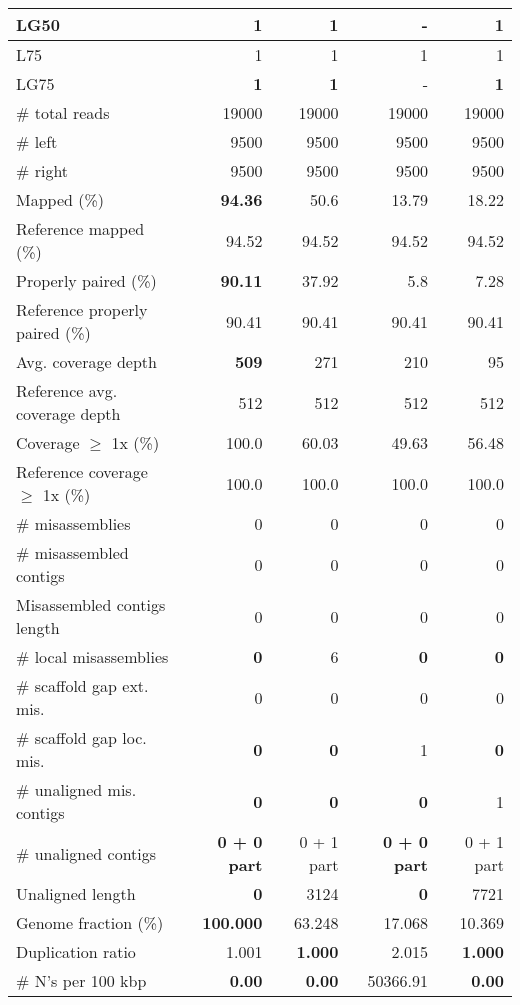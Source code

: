 \documentclass[12pt,a4paper]{article}
\begin{document}
\begin{table}[ht]
\begin{center}
\begin{tabular}{|l*{4}{|r}|}
LG50 & {\bf 1} & {\bf 1} & - & {\bf 1} \\ \hline
L75 & 1 & 1 & 1 & 1 \\ \hline
LG75 & {\bf 1} & {\bf 1} & - & {\bf 1} \\ \hline
\# total reads & 19000 & 19000 & 19000 & 19000 \\ \hline
\# left & 9500 & 9500 & 9500 & 9500 \\ \hline
\# right & 9500 & 9500 & 9500 & 9500 \\ \hline
Mapped (\%) & {\bf 94.36} & 50.6 & 13.79 & 18.22 \\ \hline
Reference mapped (\%) & 94.52 & 94.52 & 94.52 & 94.52 \\ \hline
Properly paired (\%) & {\bf 90.11} & 37.92 & 5.8 & 7.28 \\ \hline
Reference properly paired (\%) & 90.41 & 90.41 & 90.41 & 90.41 \\ \hline
Avg. coverage depth & {\bf 509} & 271 & 210 & 95 \\ \hline
Reference avg. coverage depth & 512 & 512 & 512 & 512 \\ \hline
Coverage $\geq$ 1x (\%) & 100.0 & 60.03 & 49.63 & 56.48 \\ \hline
Reference coverage $\geq$ 1x (\%) & 100.0 & 100.0 & 100.0 & 100.0 \\ \hline
\# misassemblies & 0 & 0 & 0 & 0 \\ \hline
\# misassembled contigs & 0 & 0 & 0 & 0 \\ \hline
Misassembled contigs length & 0 & 0 & 0 & 0 \\ \hline
\# local misassemblies & {\bf 0} & 6 & {\bf 0} & {\bf 0} \\ \hline
\# scaffold gap ext. mis. & 0 & 0 & 0 & 0 \\ \hline
\# scaffold gap loc. mis. & {\bf 0} & {\bf 0} & 1 & {\bf 0} \\ \hline
\# unaligned mis. contigs & {\bf 0} & {\bf 0} & {\bf 0} & 1 \\ \hline
\# unaligned contigs & {\bf 0 + 0 part} & 0 + 1 part & {\bf 0 + 0 part} & 0 + 1 part \\ \hline
Unaligned length & {\bf 0} & 3124 & {\bf 0} & 7721 \\ \hline
Genome fraction (\%) & {\bf 100.000} & 63.248 & 17.068 & 10.369 \\ \hline
Duplication ratio & 1.001 & {\bf 1.000} & 2.015 & {\bf 1.000} \\ \hline
\# N's per 100 kbp & {\bf 0.00} & {\bf 0.00} & 50366.91 & {\bf 0.00} \\ \hline

\end{tabular}
\end{center}
\end{table}
\end{document}
